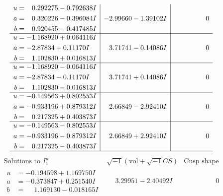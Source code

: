 \documentclass[1p]{elsarticle_modified}
\theoremstyle{definition}
\newcommand{\I}{\sqrt{-1}}
\begin{document}
$$\begin{array}{c|c|c}
\begin{aligned}
u &= \phantom{-}0.292275 - 0.792638 I \\
a &= \phantom{-}0.320226 - 0.396084 I \\
b &= \phantom{-}0.920455 - 0.417485 I\end{aligned}
 & -2.99660 - 1.39102 I & \phantom{-0.000000 } 0 \\ \hline\begin{aligned}
u &= -1.168920 + 0.064116 I \\
a &= -2.87834 + 0.11170 I \\
b &= \phantom{-}1.102830 + 0.016813 I\end{aligned}
 & \phantom{-}3.71741 - 0.14086 I & \phantom{-0.000000 } 0 \\ \hline\begin{aligned}
u &= -1.168920 - 0.064116 I \\
a &= -2.87834 - 0.11170 I \\
b &= \phantom{-}1.102830 - 0.016813 I\end{aligned}
 & \phantom{-}3.71741 + 0.14086 I & \phantom{-0.000000 } 0 \\ \hline\begin{aligned}
u &= -0.149563 + 0.802553 I \\
a &= -0.933196 + 0.879312 I \\
b &= \phantom{-}0.217325 + 0.403873 I\end{aligned}
 & \phantom{-}2.66849 - 2.92410 I & \phantom{-0.000000 } 0 \\ \hline\begin{aligned}
u &= -0.149563 - 0.802553 I \\
a &= -0.933196 - 0.879312 I \\
b &= \phantom{-}0.217325 - 0.403873 I\end{aligned}
 & \phantom{-}2.66849 + 2.92410 I & \phantom{-0.000000 } 0\\
 \hline 
 \end{array}$$\newpage$$\begin{array}{c|c|c}  
\text{Solutions to }I^u_{1}& \I (\text{vol} + \sqrt{-1}CS) & \text{Cusp shape}\\
 \hline 
\begin{aligned}
u &= -0.194598 + 1.169750 I \\
a &= -0.373847 + 0.251540 I \\
b &= \phantom{-}1.169130 - 0.018165 I\end{aligned}
 & \phantom{-}3.29951 - 2.40492 I & \phantom{-0.000000 } 0 \\ \hline\begin{aligned}

\end{aligned}
\end{array}$$
\end{document}
